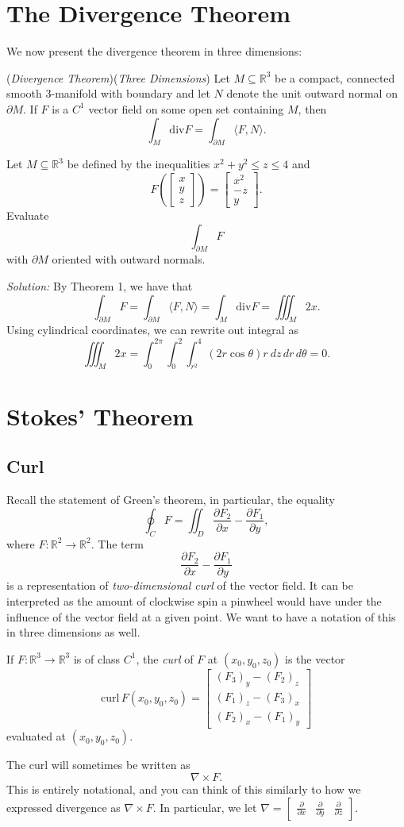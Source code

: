 \documentclass[11pt]{article}
\theoremstyle{definition}
\newcommand{\R}{\mathbb{R}}                      %
\newcommand{\mat}{\begin{bmatrix}}
\newcommand{\trix}{\end{bmatrix}}
\newcommand{\dell}{\partial}
\begin{document}
\section{The Divergence Theorem}
We now present the divergence theorem in three dimensions:
\begin{shaded}
\theorem (\textit{Divergence Theorem})(\textit{Three Dimensions}) Let $M\subseteq \R^3$ be a compact, connected smooth $3$-manifold with boundary and let $N$ denote the unit outward normal on $\dell M$. If $F$ is a $C^1$ vector field on some open set containing $M$, then
$$
\int_M \mathrm{div}F = \int_{\dell M} \langle F, N\rangle.
$$
\end{shaded}
\ex Let $M\subseteq \R^3$ be defined by the inequalities $x^2+y^2\leq z\leq 4$ and 
$$
F\left(\begin{bmatrix} x \\ y \\ z\end{bmatrix}\right)=\mat x^2 \\ -z \\ y \trix.
$$
Evaluate
$$
\int_{\dell M} F
$$
with $\dell M$ oriented with outward normals.

\textit{Solution:} By Theorem 1, we have that
$$
\int_{\dell M} F = \int_{\dell M} \langle F,N\rangle =\int_M \mathrm{div} F = \iiint_M 2x.
$$
Using cylindrical coordinates, we can rewrite out integral as
$$
\iiint_M 2x = \int_0^{2\pi} \int_0^2 \int_{r^2}^4 (2r\cos\theta)r~dz\,dr\,d\theta =0.
$$

\section{Stokes' Theorem}
\subsection{Curl}
Recall the statement of Green's theorem, in particular, the equality
$$
\oint_C F = \iint_D \frac{\dell F_2}{\dell x}-\frac{\dell F_1}{\dell y},
$$
where $F:\R^2\to \R^2$. The term
$$
\frac{\dell F_2}{\dell x}-\frac{\dell F_1}{\dell y}
$$
is a representation of \textit{two-dimensional curl} of the vector field. It can be interpreted as the amount of clockwise spin a pinwheel would have under the influence of the vector field at a given point. We want to have a notation of this in three dimensions as well.
\begin{mdframed}[backgroundcolor = blue!10]
\vspace{+0.1cm}
 If $F:\R^3\to\R^3$ is of class $C^1$, the \textit{curl} of $F$ at $(x_0,y_0,z_0)$ is the vector
$$
\mathrm{curl}\,F(x_0,y_0,z_0) = \mat (F_3)_y - (F_2)_z\\ (F_1)_z - (F_3)_x \\ (F_2)_x - (F_1)_y \trix
$$
evaluated at $(x_0,y_0,z_0)$.
\end{mdframed}
\note The curl will sometimes be written as 
$$
\nabla \times F.
$$
This is entirely notational, and you can think of this similarly to how we expressed divergence as $\nabla \times F$. In particular, we let $\nabla = \mat \frac{\dell}{\dell x}&\frac{\dell}{\dell y}&\frac{\dell}{\dell z}\trix$.
\end{document}
